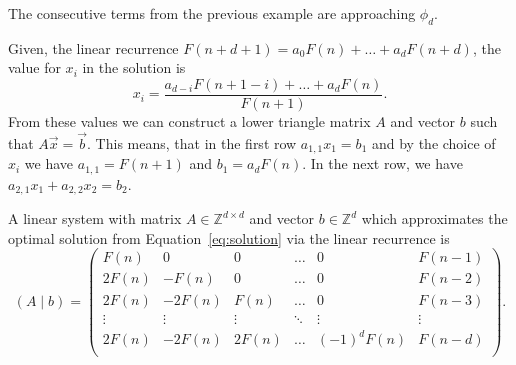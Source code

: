 \documentclass[english,version-2020-11]{uzl-thesis}
\newcommand\Z{{\mathbb Z}}
\begin{document}
\begin{corollary}
  The consecutive terms from the previous example are approaching $\phi_d$.
\end{corollary}

Given, the linear recurrence $F(n + d + 1) = a_0 F(n) + \dots + a_d F(n + d)$,
the value for $x_i$ in the solution is
\[
  x_i = \frac{a_{d-i} F(n + 1 - i) + \dots + a_d F(n)}{F(n + 1)}.
\]
From these values we can construct a lower triangle matrix $A$ and vector $b$
such that $A \vec x = \vec b$.
This means, that in the first row $a_{1,1} x_1 = b_1$
and by the choice of $x_i$ we have $a_{1,1} = F(n+1)$ and $b_1 = a_d F(n)$.
In the next row, we have $a_{2,1} x_1 + a_{2,2} x_2 = b_2$.

\begin{example}
  A linear system with matrix $A \in \Z^{d \times d}$ and vector $b \in \Z^d$
  which approximates the optimal solution from Equation~\ref{eq:solution} via
  the linear recurrence is
  \[
    (A \mid b) = \left(\begin{array}{ccccc|c}
      F(n)   & 0      & 0      & \dots  & 0           & F(n - 1) \\
      2 F(n) & -F(n)  & 0      & \dots  & 0           & F(n - 2) \\
      2 F(n) & -2F(n) & F(n)   & \dots  & 0           & F(n - 3) \\
      \vdots & \vdots & \vdots & \ddots & \vdots      & \vdots   \\
      2 F(n) & -2F(n) & 2F(n)  & \dots  & (-1)^d F(n) & F(n - d) \\
    \end{array}\right).
  \]
\end{example}
\end{document}
